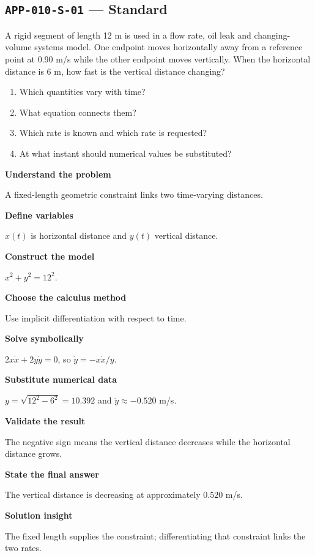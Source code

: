 \documentclass[11pt]{book}
\newcommand{\pid}[1]{\texttt{#1}}
\begin{document}
\subsection*{\pid{APP-010-S-01} — Standard}
\begin{problembox}
A rigid segment of length 12 m is used in a flow rate, oil leak and changing-volume systems model. One endpoint moves horizontally away from a reference point at 0.90 m/s while the other endpoint moves vertically. When the horizontal distance is 6 m, how fast is the vertical distance changing?
\end{problembox}
\begin{promptbox}\begin{enumerate}
\item Which quantities vary with time?
\item What equation connects them?
\item Which rate is known and which rate is requested?
\item At what instant should numerical values be substituted?
\end{enumerate}\end{promptbox}
\begin{solutionbox}
\textbf{Understand the problem}\par A fixed-length geometric constraint links two time-varying distances.\par\medskip
\textbf{Define variables}\par $x(t)$ is horizontal distance and $y(t)$ vertical distance.\par\medskip
\textbf{Construct the model}\par $x^2+y^2=12^2$.\par\medskip
\textbf{Choose the calculus method}\par Use implicit differentiation with respect to time.\par\medskip
\textbf{Solve symbolically}\par $2x\dot x+2y\dot y=0$, so $\dot y=-x\dot x/y$.\par\medskip
\textbf{Substitute numerical data}\par $y=\sqrt{12^2-6^2}=10.392$ and $\dot y\approx -0.520$ m/s.\par\medskip
\textbf{Validate the result}\par The negative sign means the vertical distance decreases while the horizontal distance grows.\par\medskip
\textbf{State the final answer}\par The vertical distance is decreasing at approximately $0.520$ m/s.\par\medskip
\textbf{Solution insight}\par The fixed length supplies the constraint; differentiating that constraint links the two rates.\par\medskip
\end{solutionbox}
\end{document}
